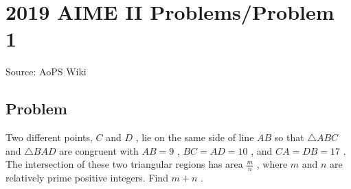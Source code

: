 \documentclass[12pt]{article}
\begin{document}
\section*{{2019 AIME II Problems/Problem 1}}
Source: AoPS Wiki

\subsection*{Problem}
Two different points, $C$ and $D$ , lie on the same side of line $AB$ so that $\triangle ABC$ and $\triangle BAD$ are congruent with $AB = 9$ , $BC=AD=10$ , and $CA=DB=17$ . The intersection of these two triangular regions has area $\tfrac mn$ , where $m$ and $n$ are relatively prime positive integers. Find $m+n$ .
\end{document}
